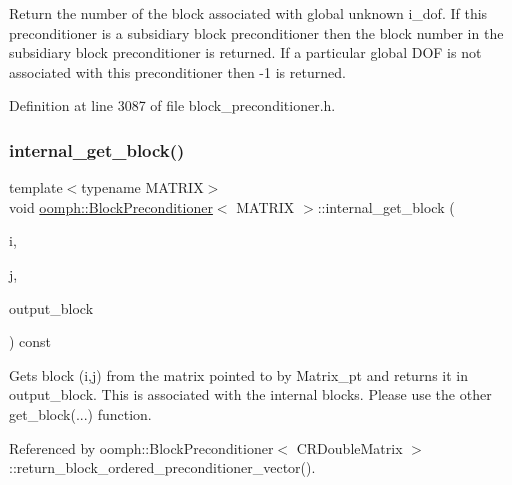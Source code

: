 Return the number of the block associated with global unknown i\+\_\+dof. If this preconditioner is a subsidiary block preconditioner then the block number in the subsidiary block preconditioner is returned. If a particular global D\+OF is not associated with this preconditioner then -\/1 is returned. 



Definition at line 3087 of file block\+\_\+preconditioner.\+h.

\mbox{\label{classoomph_1_1BlockPreconditioner_abe001ffe270c96e761ec5205364976a7}} 
\subsubsection{\texorpdfstring{internal\+\_\+get\+\_\+block()}{internal\_get\_block()}\hspace{0.1cm}{\footnotesize\ttfamily [1/2]}}
{\footnotesize\ttfamily template$<$typename M\+A\+T\+R\+IX$>$ \\
void \hyperlink{classoomph_1_1BlockPreconditioner}{oomph\+::\+Block\+Preconditioner}$<$ M\+A\+T\+R\+IX $>$\+::internal\+\_\+get\+\_\+block (\begin{DoxyParamCaption}\item[{const unsigned \&}]{i,  }\item[{const unsigned \&}]{j,  }\item[{M\+A\+T\+R\+IX \&}]{output\+\_\+block }\end{DoxyParamCaption}) const}



Gets block (i,j) from the matrix pointed to by Matrix\+\_\+pt and returns it in output\+\_\+block. This is associated with the internal blocks. Please use the other get\+\_\+block(...) function. 



Referenced by oomph\+::\+Block\+Preconditioner$<$ C\+R\+Double\+Matrix $>$\+::return\+\_\+block\+\_\+ordered\+\_\+preconditioner\+\_\+vector().

\mbox{\label{classoomph_1_1BlockPreconditioner_a4c824a95d71ce68ee7e1acf6d45178e3}} 
